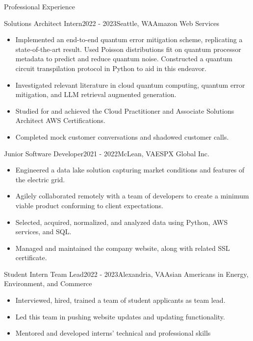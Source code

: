 \begin{rSection}{Professional Experience}

\begin{rSubsection}{Solutions Architect Intern}{2022 - 2023}{Seattle, WA}{\small{Amazon Web Services}}
\begin{itemize}
	\item Implemented an end-to-end quantum error mitigation scheme, replicating a state-of-the-art result. Used Poisson distributions fit on quantum processor metadata to predict and reduce quantum noise. Constructed a quantum circuit transpilation protocol in Python to aid in this endeavor.
	\item Investigated relevant literature in cloud quantum computing, quantum error mitigation, and LLM retrieval augmented generation.
	\item Studied for and achieved the Cloud Practitioner and Associate Solutions Architect AWS Certifications.
	\item Completed mock customer conversations and shadowed customer calls.
\end{itemize}
\end{rSubsection}
\begin{rSubsection}{Junior Software Developer}{2021 - 2022}{McLean, VA}{\small{ESPX Global Inc.}}
\begin{itemize}
	\item Engineered a data lake solution capturing market conditions and features of the electric grid.
	\item Agilely collaborated remotely with a team of developers to create a minimum viable product conforming to client expectations.
	\item Selected, acquired, normalized, and analyzed data using Python, AWS services, and SQL.
	\item Managed and maintained the company website, along with related SSL certificate.
\end{itemize}
\end{rSubsection}
\begin{rSubsection}{Student Intern Team Lead}{2022 - 2023}{Alexandria, VA}{\small{Asian Americans in Energy, Environment, and Commerce}}
\begin{itemize}
	\item Interviewed, hired, trained a team of student applicants as team lead.
	\item Led this team in pushing website updates and updating functionality.
	\item Mentored and developed interns' technical and professional skills
\end{itemize}
\end{rSubsection}
\end{rSection}
